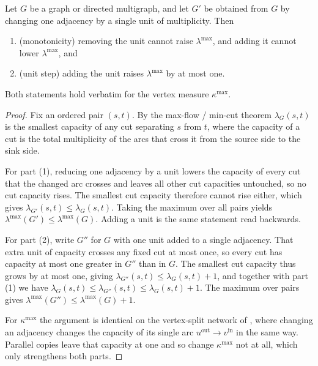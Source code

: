 \begin{proposition}\label{prop:monotone}
Let $G$ be a graph or directed multigraph, and let $G'$ be obtained from $G$ by changing one adjacency by a single unit of multiplicity. Then
\begin{enumerate}[label=(\arabic*)]
    \item \textup{(monotonicity)} removing the unit cannot raise $\lambda^{\max}$, and adding it cannot lower $\lambda^{\max}$, and
    \item \textup{(unit step)} adding the unit raises $\lambda^{\max}$ by at most one.
\end{enumerate}
Both statements hold verbatim for the vertex measure $\kappa^{\max}$.
\end{proposition}

\begin{proof}
Fix an ordered pair $(s,t)$. By the max-flow / min-cut theorem $\lambda_G(s,t)$ is the smallest capacity of any cut separating $s$ from $t$, where the capacity of a cut is the total multiplicity of the arcs that cross it from the source side to the sink side.

For part (1), reducing one adjacency by a unit lowers the capacity of every cut that the changed arc crosses and leaves all other cut capacities untouched, so no cut capacity rises. The smallest cut capacity therefore cannot rise either, which gives $\lambda_{G'}(s,t) \le \lambda_G(s,t)$. Taking the maximum over all pairs yields $\lambda^{\max}(G') \le \lambda^{\max}(G)$. Adding a unit is the same statement read backwards.

For part (2), write $G''$ for $G$ with one unit added to a single adjacency. That extra unit of capacity crosses any fixed cut at most once, so every cut has capacity at most one greater in $G''$ than in $G$. The smallest cut capacity thus grows by at most one, giving $\lambda_{G''}(s,t) \le \lambda_G(s,t) + 1$, and together with part (1) we have $\lambda_G(s,t) \le \lambda_{G''}(s,t) \le \lambda_G(s,t) + 1$. The maximum over pairs gives $\lambda^{\max}(G'') \le \lambda^{\max}(G) + 1$.

For $\kappa^{\max}$ the argument is identical on the vertex-split network of , where changing an adjacency changes the capacity of its single arc $u^{\mathrm{out}} \to v^{\mathrm{in}}$ in the same way. Parallel copies leave that capacity at one and so change $\kappa^{\max}$ not at all, which only strengthens both parts.
\end{proof}

